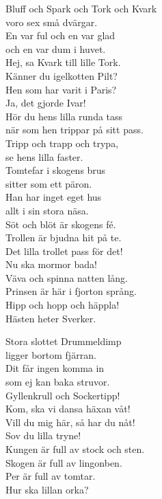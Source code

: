 \documentclass[a6paper, 10pt, twoside]{article}
\begin{document}
\small %
\begin{center}
\end{center}
\begin{lyrics}
Bluff och Spark och Tork och Kvark \\
voro sex små dvärgar. \\
En var ful och en var glad\\ 
och en var dum i huvet.
\vspace{5pt}\\ 
Hej, sa Kvark till lille Tork.\\ 
Känner du igelkotten Pilt?\\
Hen som har varit i Paris? \\
Ja, det gjorde Ivar!
\vspace{5pt}\\
Hör du hens lilla runda tass\\ 
när som hen trippar på sitt pass.\\ 
Tripp och trapp och trypa,\\
se hens lilla faster.
\vspace{5pt}\\ 
Tomtefar i skogens brus\\ 
sitter som ett päron.\\
Han har inget eget hus\\ 
allt i sin stora näsa.
\vspace{5pt}\\ 
Söt och blöt är skogens fé.\\ 
Trollen är bjudna hit på te.\\ 
Det lilla trollet pass för det!\\ 
Nu ska mormor bada!
\vspace{5pt}\\ 
Väva och spinna natten lång.\\ 
Prinsen är här i fjorton språng.\\ 
Hipp och hopp och häppla!\\ 
Hästen heter Sverker.

\newpage
Stora slottet Drummeldimp\\ 
ligger bortom fjärran.\\
Dit får ingen komma in\\ 
som ej kan baka struvor.
\vspace{5pt}\\ 
Gyllenkrull och Sockertipp!\\ 
Kom, ska vi dansa häxan våt!\\ 
Vill du mig här, så har du nåt!\\ 
Sov du lilla tryne!
\vspace{5pt}\\ 
Kungen är full av stock och sten.\\ 
Skogen är full av lingonben.\\ 
Per är full av tomtar.\\ 
Hur ska lillan orka?\\
\end{lyrics}
\end{document}
